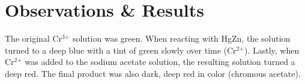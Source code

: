 \documentclass[11pt]{article}
\newcommand{\super}[1]{\ensuremath{^{\textrm{#1}}}}
\begin{document}
\section{Observations \& Results}
The original Cr\super{3+} solution was green. When reacting with HgZn, the solution turned to a deep blue with a tint of green slowly over time (Cr\super{2+}). Lastly, when Cr\super{2+} was added to the sodium acetate solution, the resulting solution turned a deep red. The final product was also dark, deep red in color (chromous acetate).







\raggedright




\end{document}
